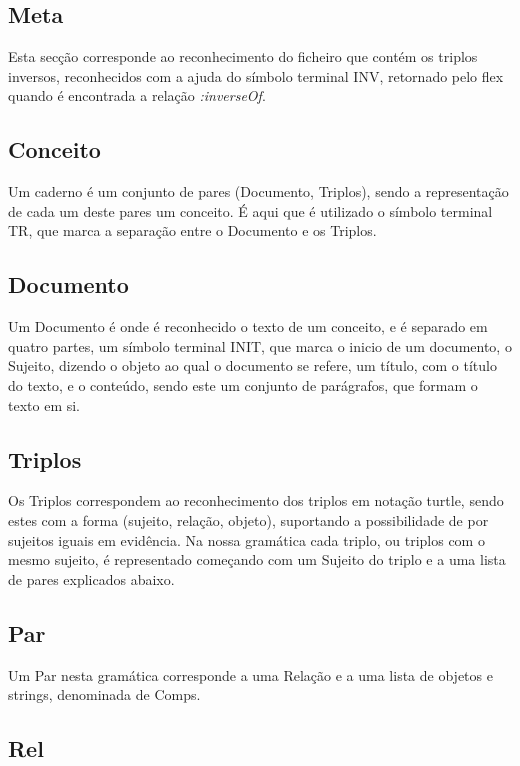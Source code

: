 \documentclass[a4paper]{report}
\begin{document}
\subsection{Meta} 

Esta secção corresponde ao reconhecimento do ficheiro que contém os triplos
inversos, reconhecidos com a ajuda do símbolo terminal INV, retornado pelo flex
quando é encontrada a relação \textit{:inverseOf}.

\subsection{Conceito}

Um caderno é um conjunto de pares (Documento, Triplos), sendo a representação
de cada um deste pares um conceito. É aqui que é utilizado o símbolo terminal
TR, que marca a separação entre o Documento e os Triplos.

\subsection{Documento}

Um Documento é onde é reconhecido o texto de um conceito, e é separado em quatro
partes, um símbolo terminal INIT, que marca o inicio de um documento, o Sujeito,
dizendo o objeto ao qual o documento se refere, um título, com o título do
texto, e o conteúdo, sendo este um conjunto de parágrafos, que formam o texto em
si.

\subsection{Triplos}

Os Triplos correspondem ao reconhecimento dos triplos em notação turtle, sendo
estes com a forma (sujeito, relação, objeto), suportando a possibilidade de por
sujeitos iguais em evidência. Na nossa gramática cada triplo, ou triplos com o
mesmo sujeito, é representado começando com um Sujeito do triplo e a uma lista
de pares explicados abaixo.

\subsection{Par}

Um Par nesta gramática corresponde a uma Relação e a uma lista de objetos e
strings, denominada de Comps. 

\subsection{Rel}
\end{document}
